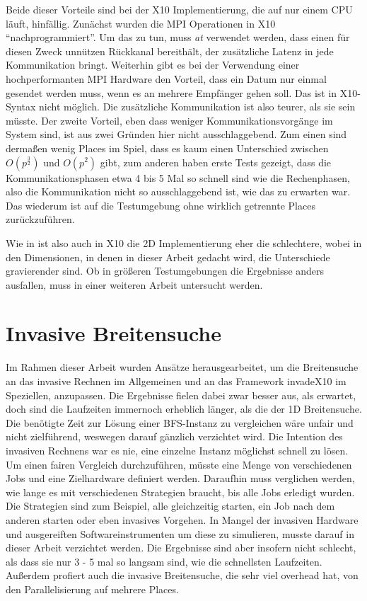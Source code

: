 Beide dieser Vorteile sind bei der X10 Implementierung, die auf nur einem CPU läuft, hinfällig. Zunächst wurden die MPI Operationen in X10 \enquote{nachprogrammiert}. Um das zu tun, muss \textit{at} verwendet werden, dass einen für diesen Zweck unnützen Rückkanal bereithält, der zusätzliche Latenz in jede Kommunikation bringt. Weiterhin gibt es bei der Verwendung einer hochperformanten MPI Hardware den Vorteil, dass ein Datum nur einmal gesendet werden muss, wenn es an mehrere Empfänger gehen soll. Das ist in X10-Syntax nicht möglich. Die zusätzliche Kommunikation ist also teurer, als sie sein müsste. 
Der zweite Vorteil, eben dass weniger Kommunikationsvorgänge im System sind, ist aus zwei Gründen hier nicht ausschlaggebend. Zum einen sind dermaßen wenig Places im Spiel, dass es kaum einen Unterschied zwischen $O(p^{\frac{3}{2}})$ und $O(p^2)$ gibt, zum anderen haben erste Tests gezeigt, dass die Kommunikationsphasen etwa 4 bis 5 Mal so schnell sind wie die Rechenphasen, also die Kommunikation nicht so ausschlaggebend ist, wie das zu erwarten war. Das wiederum ist auf die Testumgebung ohne wirklich getrennte Places zurückzuführen.

Wie in \cite{Buluc:2011} ist also auch in X10 die 2D Implementierung eher die schlechtere, wobei in den Dimensionen, in denen in dieser Arbeit gedacht wird, die Unterschiede gravierender sind. Ob in größeren Testumgebungen die Ergebnisse anders ausfallen, muss in einer weiteren Arbeit untersucht werden.

\section{Invasive Breitensuche} %
\label{sec:invasive_breitensuche}
Im Rahmen dieser Arbeit wurden Ansätze herausgearbeitet, um die Breitensuche an das invasive Rechnen im Allgemeinen und an das Framework invadeX10 im Speziellen, anzupassen. Die Ergebnisse fielen dabei zwar besser aus, als erwartet, doch sind die Laufzeiten immernoch erheblich länger, als die der 1D Breitensuche. Die benötigte Zeit zur Lösung einer BFS-Instanz zu vergleichen wäre unfair und nicht zielführend, weswegen darauf gänzlich verzichtet wird. Die Intention des invasiven Rechnens war es nie, eine einzelne Instanz möglichst schnell zu lösen. Um einen fairen Vergleich durchzuführen, müsste eine Menge von verschiedenen Jobs und eine Zielhardware definiert werden. Daraufhin muss verglichen werden, wie lange es mit verschiedenen Strategien braucht, bis alle Jobs erledigt wurden. Die Strategien sind zum Beispiel, alle gleichzeitig starten, ein Job nach dem anderen starten oder eben invasives Vorgehen. In Mangel der invasiven Hardware und ausgereiften Softwareinstrumenten um diese zu simulieren, musste darauf in dieser Arbeit verzichtet werden. Die Ergebnisse sind aber insofern nicht schlecht, als dass sie nur 3 - 5 mal so langsam sind, wie die schnellsten Laufzeiten. Außerdem profiert auch die invasive Breitensuche, die sehr viel overhead hat, von den Parallelisierung auf mehrere Places.

